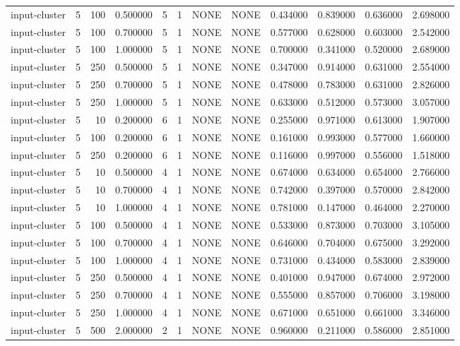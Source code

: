 \begin{tabular}{lrrrllllrrrr}
input-cluster & 5 & 100 & 0.500000 & 5 & 1 & NONE & NONE & 0.434000 & 0.839000 & 0.636000 & 2.698000 \\
input-cluster & 5 & 100 & 0.700000 & 5 & 1 & NONE & NONE & 0.577000 & 0.628000 & 0.603000 & 2.542000 \\
input-cluster & 5 & 100 & 1.000000 & 5 & 1 & NONE & NONE & 0.700000 & 0.341000 & 0.520000 & 2.689000 \\
input-cluster & 5 & 250 & 0.500000 & 5 & 1 & NONE & NONE & 0.347000 & 0.914000 & 0.631000 & 2.554000 \\
input-cluster & 5 & 250 & 0.700000 & 5 & 1 & NONE & NONE & 0.478000 & 0.783000 & 0.631000 & 2.826000 \\
input-cluster & 5 & 250 & 1.000000 & 5 & 1 & NONE & NONE & 0.633000 & 0.512000 & 0.573000 & 3.057000 \\
input-cluster & 5 & 10 & 0.200000 & 6 & 1 & NONE & NONE & 0.255000 & 0.971000 & 0.613000 & 1.907000 \\
input-cluster & 5 & 100 & 0.200000 & 6 & 1 & NONE & NONE & 0.161000 & 0.993000 & 0.577000 & 1.660000 \\
input-cluster & 5 & 250 & 0.200000 & 6 & 1 & NONE & NONE & 0.116000 & 0.997000 & 0.556000 & 1.518000 \\
input-cluster & 5 & 10 & 0.500000 & 4 & 1 & NONE & NONE & 0.674000 & 0.634000 & 0.654000 & 2.766000 \\
input-cluster & 5 & 10 & 0.700000 & 4 & 1 & NONE & NONE & 0.742000 & 0.397000 & 0.570000 & 2.842000 \\
input-cluster & 5 & 10 & 1.000000 & 4 & 1 & NONE & NONE & 0.781000 & 0.147000 & 0.464000 & 2.270000 \\
input-cluster & 5 & 100 & 0.500000 & 4 & 1 & NONE & NONE & 0.533000 & 0.873000 & 0.703000 & 3.105000 \\
input-cluster & 5 & 100 & 0.700000 & 4 & 1 & NONE & NONE & 0.646000 & 0.704000 & 0.675000 & 3.292000 \\
input-cluster & 5 & 100 & 1.000000 & 4 & 1 & NONE & NONE & 0.731000 & 0.434000 & 0.583000 & 2.839000 \\
input-cluster & 5 & 250 & 0.500000 & 4 & 1 & NONE & NONE & 0.401000 & 0.947000 & 0.674000 & 2.972000 \\
input-cluster & 5 & 250 & 0.700000 & 4 & 1 & NONE & NONE & 0.555000 & 0.857000 & 0.706000 & 3.198000 \\
input-cluster & 5 & 250 & 1.000000 & 4 & 1 & NONE & NONE & 0.671000 & 0.651000 & 0.661000 & 3.346000 \\
input-cluster & 5 & 500 & 2.000000 & 2 & 1 & NONE & NONE & 0.960000 & 0.211000 & 0.586000 & 2.851000 \\

\end{tabular}
